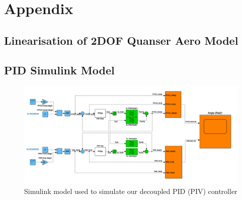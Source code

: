 \documentclass[11pt]{article}
\begin{document}
\newpage
\section{Appendix}
\subsection{Linearisation of 2DOF Quanser Aero Model}\label{app:linearise}

\subsection{PID Simulink Model}\label{W4PIDsim}
\begin{figure}[H]
    \centering
    \includegraphics[width=15cm]{W4PIDsim.png}
    \caption{Simulink model used to simulate our decoupled PID (PIV) controller}
    \label{fig:W4PIDsim}
\end{figure}
\end{document}
